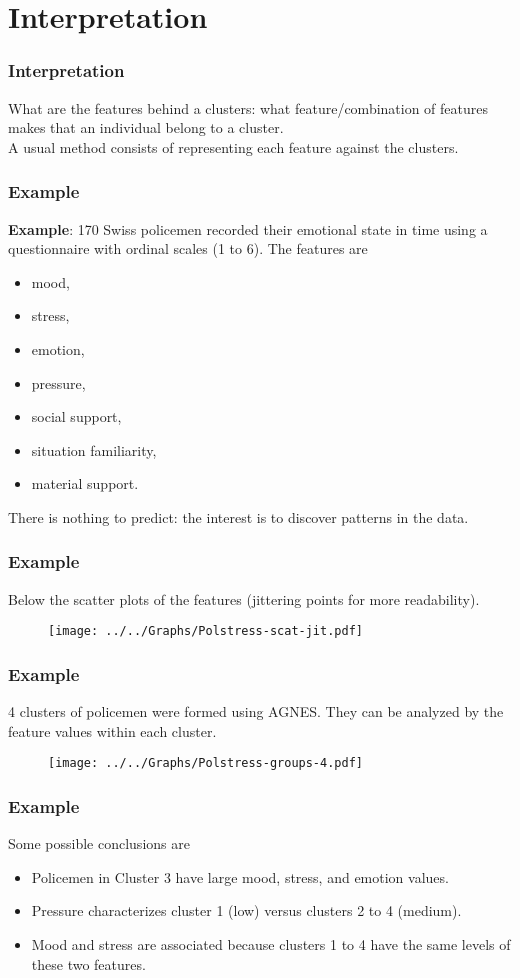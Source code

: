 \section{Interpretation}
\begin{frame}
\frametitle{Interpretation}
What are the features behind a clusters: what feature/combination of features makes that an individual belong to a cluster.\\
\vspace{0.3cm}
A usual method consists of representing each feature against the clusters.
\end{frame}
\begin{frame}
\frametitle{Example}
{\bf Example}: 170 Swiss policemen recorded their emotional state in time using a questionnaire with ordinal scales (1 to 6). The features are 
\begin{itemize}
\item mood, 
\item stress, 
\item emotion, 
\item pressure, 
\item social support, 
\item situation familiarity, 
\item material support.
\end{itemize}
There is nothing to predict: the interest is to discover patterns in the data. 
\end{frame}
\begin{frame}
\frametitle{Example}
Below the scatter plots of the features (jittering points for more readability).
\begin{figure}[!h]
\centerline{\texttt{[image: ../../Graphs/Polstress-scat-jit.pdf]}}
\end{figure}
\end{frame}
\begin{frame}
\frametitle{Example}
4 clusters of policemen were formed using AGNES. They can be analyzed by the feature values within each cluster. 
 \vspace{-1cm}
 \begin{figure}[!h]
 \centerline{\texttt{[image: ../../Graphs/Polstress-groups-4.pdf]}}
  \end{figure}
\end{frame}
\begin{frame}
\frametitle{Example}
Some possible conclusions are
\begin{itemize}
\item Policemen in Cluster 3 have large mood, stress, and emotion values. 
\item Pressure characterizes cluster 1 (low) versus clusters 2 to 4 (medium).
\item Mood and stress are associated because clusters 1 to 4 have the same levels of these two features.
\end{itemize}
\end{frame}


